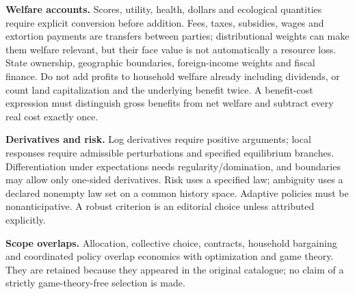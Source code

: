 \documentclass[11pt,a4paper]{article}
\begin{document}
\textbf{Welfare accounts.} Scores, utility, health, dollars and ecological quantities require explicit conversion before addition. Fees, taxes, subsidies, wages and extortion payments are transfers between parties; distributional weights can make them welfare relevant, but their face value is not automatically a resource loss. State ownership, geographic boundaries, foreign-income weights and fiscal finance. Do not add profits to household welfare already including dividends, or count land capitalization and the underlying benefit twice. A benefit-cost expression must distinguish gross benefits from net welfare and subtract every real cost exactly once.

\textbf{Derivatives and risk.} Log derivatives require positive arguments; local responses require admissible perturbations and specified equilibrium branches. Differentiation under expectations needs regularity/domination, and boundaries may allow only one-sided derivatives. Risk uses a specified law; ambiguity uses a declared nonempty law set on a common history space. Adaptive policies must be nonanticipative. A robust criterion is an editorial choice unless attributed explicitly.

\textbf{Scope overlaps.} Allocation, collective choice, contracts, household bargaining and coordinated policy overlap economics with optimization and game theory. They are retained because they appeared in the original catalogue; no claim of a strictly game-theory-free selection is made.
\end{document}

